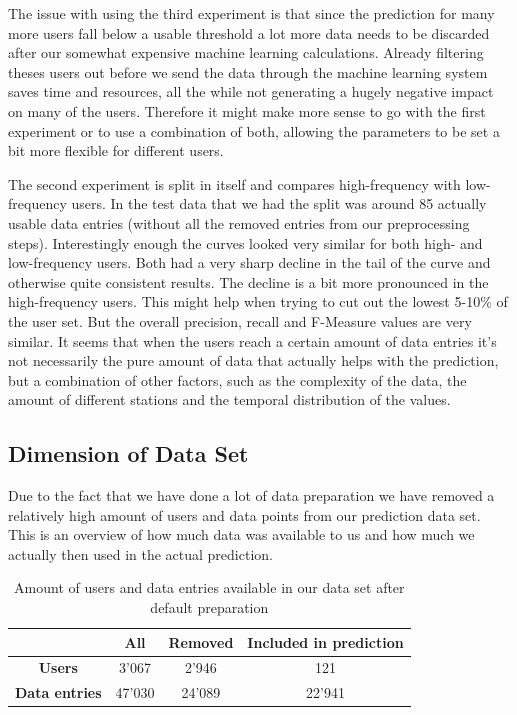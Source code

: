 The issue with using the third experiment is that since the prediction for many more users fall below a usable threshold a lot more data needs to be discarded after our somewhat expensive machine learning calculations. Already filtering theses users out before we send the data through the machine learning system saves time and resources, all the while not generating a hugely negative impact on many of the users. Therefore it might make more sense to go with the first experiment or to use a combination of both, allowing the parameters to be set a bit more flexible for different users.

The second experiment is split in itself and compares high-frequency with low-frequency users. In the test data that we had the split was around 85 actually usable data entries (without all the removed entries from our preprocessing steps). Interestingly enough the curves looked very similar for both high- and low-frequency users. Both had a very sharp decline in the tail of the curve and otherwise quite consistent results. The decline is a bit more pronounced in the high-frequency users. This might help when trying to cut out the lowest 5-10\% of the user set. But the overall precision, recall and F-Measure values are very similar. It seems that when the users reach a certain amount of data entries it's not necessarily the pure amount of data that actually helps with the prediction, but a combination of other factors, such as the complexity of the data, the amount of different stations and the temporal distribution of the values.

\subsection{Dimension of Data Set}
Due to the fact that we have done a lot of data preparation we have removed a relatively high amount of users and data points from our prediction data set. This is an overview of how much data was available to us and how much we actually then used in the actual prediction. 

\begin{table}[H]	
	\begin{center}
		\begin{tabular}{c | c | c | c}
			& All & Removed & Included in prediction \\
			\hline
			\textbf{Users} & 3'067  & 2'946 & 121 \\
			\hline
			\textbf{Data entries} & 47'030 & 24'089 & 22'941 \\
		\end{tabular}
	\end{center}
	\caption{Amount of users and data entries available in our data set after default preparation}
	\label{table:amount_of_default_users}
\end{table}

